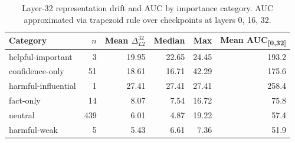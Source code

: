 \begin{table}[h]
\centering\small
\begin{tabular}{lrrrrr}
\toprule
Category & $n$ & Mean $\Delta_{L2}^{32}$ & Median & Max & Mean AUC\textsubscript{[0,32]} \\
\midrule
  helpful-important & 3 & 19.95 & 22.65 & 24.45 & 193.2 \\
  confidence-only & 51 & 18.61 & 16.71 & 42.29 & 175.6 \\
  harmful-influential & 1 & 27.41 & 27.41 & 27.41 & 258.4 \\
  fact-only & 14 & 8.07 & 7.54 & 16.72 & 75.8 \\
  neutral & 439 & 6.01 & 4.87 & 19.22 & 57.4 \\
  harmful-weak & 5 & 5.43 & 6.61 & 7.36 & 51.9 \\
\bottomrule
\end{tabular}
\caption{Layer-32 representation drift and AUC by importance category. AUC approximated via trapezoid rule over checkpoints at layers 0, 16, 32.}
\label{tab:e4_layer_drift_stats}
\end{table}
